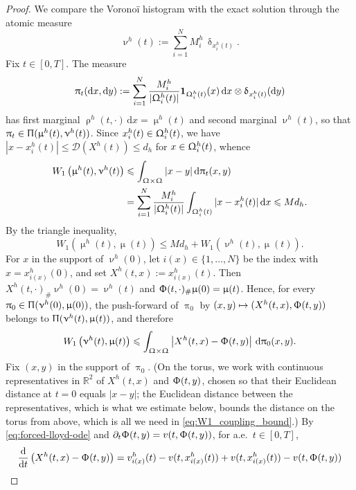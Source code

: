 \documentclass[letterpaper,11pt,twoside]{article}
\numberwithin{figure}{section}
\numberwithin{table}{section}
\theoremstyle{cpamplain}
\theoremstyle{cpamdefinition}
\newcommand{\R}{\mathbb{R}}
\newcommand{\diff}{\mathrm{d}}
\let\delta\updelta
\let\mu\upmu
\let\nu\upnu
\let\pi\uppi
\let\rho\uprho
\let\Pi\Uppi
\let\Phi\Upphi
\let\Omega\Upomega
\renewcommand{\le}{\leqslant}
\numberwithin{equation}{section}
\begin{document}
\begin{proof}
We compare the Vorono\"i histogram with the exact solution through the atomic measure
\[
\nu^h(t):=\sum_{i=1}^N M_i^h\,\delta_{x_i^h(t)} .
\]
Fix $t\in[0,T]$. The measure
\[
\pi_t(\diff x,\diff y):=\sum_{i=1}^N\frac{M_i^h}{|\Omega_i^h(t)|}\mathbf 1_{\Omega_i^h(t)}(x)\,\diff x\otimes\delta_{x_i^h(t)}(\diff y)
\]
has first marginal $\rho^h(t,\cdot)\,\diff x=\mu^h(t)$ and second marginal $\nu^h(t)$, so that $\pi_t\in\Pi(\mu^h(t),\nu^h(t))$.
Since $x_i^h(t)\in\Omega_i^h(t)$, we have $|x-x_i^h(t)|\le\mathscr D(X^h(t))\le d_h$ for $x\in\Omega_i^h(t)$, whence
\begin{equation}\label{eq:mu_to_nu}
\begin{aligned}
W_1\left(\mu^h(t),\nu^h(t)\right)
&\le\int_{\Omega\times\Omega}|x-y|\,\diff\pi_t(x,y)\\
&=\sum_{i=1}^N\frac{M_i^h}{|\Omega_i^h(t)|}\int_{\Omega_i^h(t)}|x-x_i^h(t)|\,\diff x
\le Md_h .
\end{aligned}
\end{equation}
By the triangle inequality,
\begin{equation}\label{eq:triangle_W1}
W_1\left(\mu^h(t),\mu(t)\right)
\le Md_h + W_1\left(\nu^h(t),\mu(t)\right).
\end{equation}
For $x$ in the support of $\nu^h(0)$, let $i(x)\in\{1,\dots,N\}$ be the index with $x=x_{i(x)}^h(0)$, and set
\(
X^h(t,x):=x_{i(x)}^h(t).
\)
Then $X^h(t,\cdot)_\#\nu^h(0)=\nu^h(t)$ and $\Phi(t,\cdot)_\#\mu(0)=\mu(t)$.
Hence, for every $\pi_0\in\Pi(\nu^h(0),\mu(0))$, the push-forward of $\pi_0$ by $(x,y)\mapsto (X^h(t,x),\Phi(t,y))$ belongs to $\Pi(\nu^h(t),\mu(t))$, and therefore
\begin{equation}\label{eq:W1_coupling_bound}
W_1\left(\nu^h(t),\mu(t)\right)\le \int_{\Omega\times\Omega} \left|X^h(t,x)-\Phi(t,y)\right|\,\diff\pi_0(x,y).
\end{equation}
Fix $(x,y)$ in the support of $\pi_0$.
(On the torus, we work with continuous representatives in $\R^2$ of $X^h(t,x)$ and $\Phi(t,y)$, chosen so that their Euclidean distance at $t=0$ equals $|x-y|$; the Euclidean distance between the representatives, which is what we estimate below, bounds the distance on the torus from above, which is all we need in \eqref{eq:W1_coupling_bound}.)
By \eqref{eq:forced-lloyd-ode} and $\partial_t\Phi(t,y)=v(t,\Phi(t,y))$, for a.e.\ $t\in[0,T]$,
\begin{align*}
\frac{\diff}{\diff t}\left(X^h(t,x)-\Phi(t,y)\right)
&=v_{i(x)}^h(t)-v(t,x_{i(x)}^h(t))
+v(t,x_{i(x)}^h(t))-v(t,\Phi(t,y))\\

\end{align*}
\end{proof}
\end{document}
